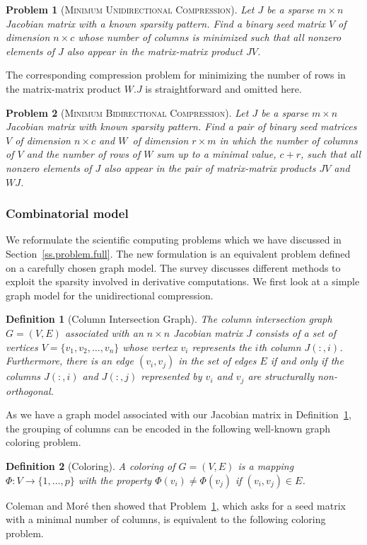 \documentclass[12pt, twoside,a4paper,toc=bibliography]{scrbook}
\newtheorem{problem}{Problem}
\newtheorem{definition}{Definition}
\newcommand{\secref}[1]{Section~\protect\ref{#1}}
\newcommand{\defref}[1]{Definition~\protect\ref{#1}}
\newcommand{\col}{\ensuremath{c}}
\newcommand{\row}{\ensuremath{r}}
\newcommand{\MinUniCom}{\textsc{Minimum Unidirectional Compression}}
\newcommand{\MinBidCom}{\textsc{Minimum Bidirectional Compression}}
\begin{document}
\begin{problem}[\MinUniCom]
\label{p.seed.uni} Let $J$ be a sparse ${m\times n}$ Jacobian matrix with a known sparsity
pattern. Find a binary seed matrix $V$ of dimension $n\times \col$
whose number of columns is minimized
such that all nonzero elements of $J$ also appear in
the matrix-matrix product $JV$.
\end{problem}
The corresponding compression problem for minimizing the number of rows in the matrix-matrix
product $W.J$ is straightforward and omitted here.

\begin{problem}[\MinBidCom]
\label{p.seed.bid} Let $J$ be a sparse ${m\times n}$ Jacobian matrix with known sparsity
pattern. Find a pair of binary seed matrices $V$ of dimension $n\times \col$ and $W$~of
dimension $\row \times m$ in which the number of columns of $V$ and the number of rows of $W$ sum up to a minimal value, $\col + \row$, such that all nonzero elements of $J$ also appear in
the pair of matrix-matrix products $JV$ and $WJ$.
\end{problem}

\subsubsection{Combinatorial model}
\label{s.modeling.full}
We reformulate the scientific computing problems which
we have discussed in \secref{ss.problem.full}.
The new formulation is an equivalent problem defined on a
carefully chosen graph model. The survey \cite{Gebremedhin05whatcolor}
discusses different methods
to exploit the sparsity involved in derivative computations.
We first look at a simple graph model for the unidirectional compression.
%
\begin{definition}[Column Intersection Graph]
\label{d:cig}
The column intersection graph $G = (V,E)$ associated with an $n \times n$ Jacobian matrix $J$
consists of a set of vertices $V=\{v_1, v_2, \dots, v_n\}$ whose vertex $v_i$ represents
the $i$th column $J(:,i)$. Furthermore, there is an edge $(v_i,v_j)$ in the set of edges
$E$ if and only if the columns $J(:,i)$ and $J(:,j)$ represented by $v_i$ and $v_j$
are structurally non-orthogonal.
\end{definition}

As we have a graph model associated with our Jacobian matrix in \defref{d:cig},
the grouping of columns can be encoded in the following well-known graph coloring problem.
%
\begin{definition}[Coloring]
A coloring of $G=(V,E)$ is a mapping $\Phi : V \to \{1, \dots, p\}$ with the property
$\Phi(v_i)\neq \Phi(v_j)$ if $(v_i,v_j) \in E$.
\end{definition}
%
Coleman and Mor\'{e} \cite{Coleman1983EoS} then showed that Problem~\ref{p.seed.uni}, which
asks for a seed matrix with a minimal number of columns, is equivalent to the following
coloring problem.
\end{document}
